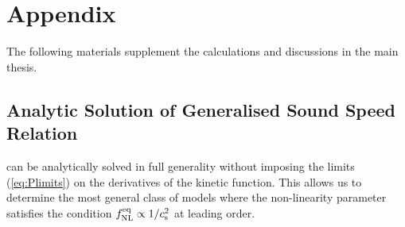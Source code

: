 % 


\chapter{Appendix}
\label{ch:appendix}

The following materials supplement the calculations and discussions in the main thesis.

\section{Analytic Solution of Generalised Sound Speed Relation}
\label{sec:apx-multi}
 can be analytically solved in full 
generality without imposing the limits (\ref{eq:Plimits}) on the 
derivatives of the kinetic function. This allows us to determine the 
most general class of models where the non-linearity parameter 
satisfies the condition $f_{\mathrm{NL}}^{\mathrm{eq}} \propto 1/c_\mathrm{s}^2$ at leading order. 

